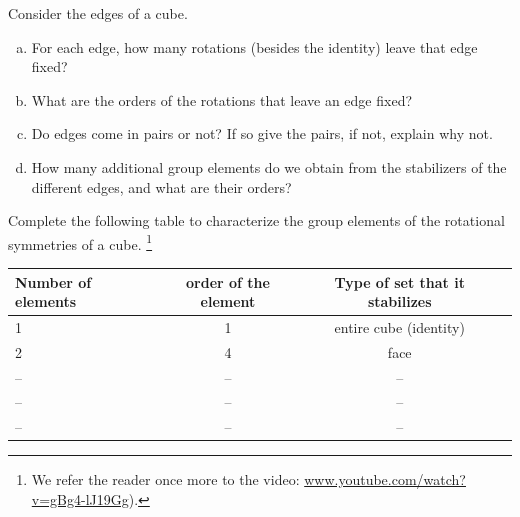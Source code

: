 \begin{exercise}\label{exercise:actions:Stabilizers1}
Consider the edges of a cube.
\begin{enumerate}[(a)]
\item
For each edge, how many rotations (besides the identity) leave that edge fixed?
\item
What are the orders of the rotations that leave an edge fixed?
\item
Do edges come in pairs or not?  If so give the pairs, if not, explain why not.
\item
How many additional group elements do we obtain from the stabilizers of the different edges, and what are their orders? 
\end{enumerate}
\end{exercise}
\begin{exercise}\label{exercise:actions:Stabilizers2}
Complete the following table to characterize the group elements of the rotational symmetries of a cube.
\footnote{We refer the reader once more to the video: \url{www.youtube.com/watch?v=gBg4-lJ19Gg}).}

\begin{tabular}{| l |c|c| r |}\hline
  Number of elements & order of the element & Type of set that it stabilizes \\ \hline
  1 & 1 & entire cube (identity) \\ \hline
  2 & 4 & face \\ \hline
 -- & -- & -- \\ \hline
-- & -- & -- \\ \hline
-- & -- & -- \\ \hline
\end{tabular}
\end{exercise}
